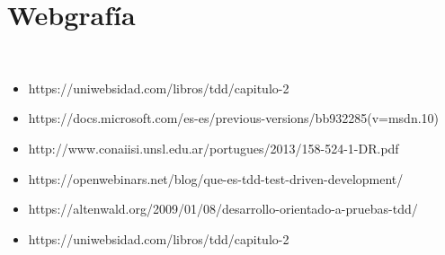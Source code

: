 \section{Webgrafía} 
\textbf{}\\
\begin{flushleft}

\begin{itemize}

	\item https://uniwebsidad.com/libros/tdd/capitulo-2
           \item https://docs.microsoft.com/es-es/previous-versions/bb932285(v=msdn.10)
           \item http://www.conaiisi.unsl.edu.ar/portugues/2013/158-524-1-DR.pdf
           \item https://openwebinars.net/blog/que-es-tdd-test-driven-development/
           \item https://altenwald.org/2009/01/08/desarrollo-orientado-a-pruebas-tdd/
           \item https://uniwebsidad.com/libros/tdd/capitulo-2


\end{itemize} 


\end{flushleft}